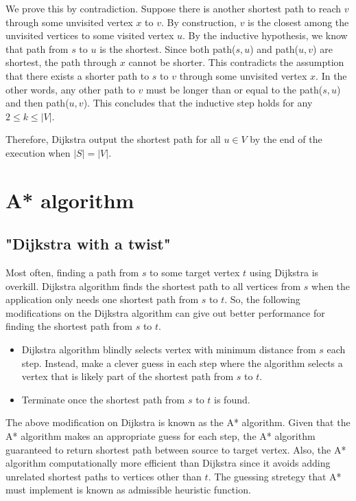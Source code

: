 \documentclass{article}
\begin{document}
We prove this by contradiction. Suppose there is another shortest path to reach $v$ through some unvisited vertex $x$ to $v$. By construction, $v$ is the closest among the unvisited vertices to some visited vertex $u$. By the inductive hypothesis, we know that path from $s$ to $u$ is the shortest. Since both path($s,u$) and path($u,v$) are shortest, the path through $x$ cannot be shorter. This contradicts the assumption that there exists a shorter path to $s$ to $v$ through some unvisited vertex $x$.
In the other words, any other path to $v$ must be longer than or equal to the path($s, u$) and then path($u, v$). This concludes that the inductive step holds for any $2 \leq k \leq |V|$. 

Therefore, Dijkstra output the shortest path for all $u \in V$ by the end of the execution when $|S| = |V|$.


\section{A* algorithm}
\subsection{"Dijkstra with a twist" \cite{Buckland}}
Most often, finding a path from $s$ to some target vertex $t$ using Dijkstra is overkill. Dijkstra algorithm finds the shortest path to all vertices from $s$ when the application only needs one shortest path from $s$ to $t$. So, the following modifications on the Dijkstra algorithm can give out better performance for finding the shortest path from $s$ to $t$. 
\begin{itemize}
    \item Dijkstra algorithm blindly selects vertex with minimum distance from $s$ each step. Instead, make a clever guess in each step where the algorithm selects a vertex that is likely part of the shortest path from $s$ to $t$.\cite{Buckland, HNR}
    \item Terminate once the shortest path from $s$ to $t$ is found.
\end{itemize}
The above modification on Dijkstra is known as the A* algorithm. Given that the A* algorithm makes an appropriate guess for each step, the A* algorithm guaranteed to return shortest path between source to target vertex. Also, the A* algorithm computationally more efficient than Dijkstra since it avoids adding unrelated shortest paths to vertices other than $t$. The guessing stretegy that A* must implement is known as admissible heuristic function.
\end{document}
